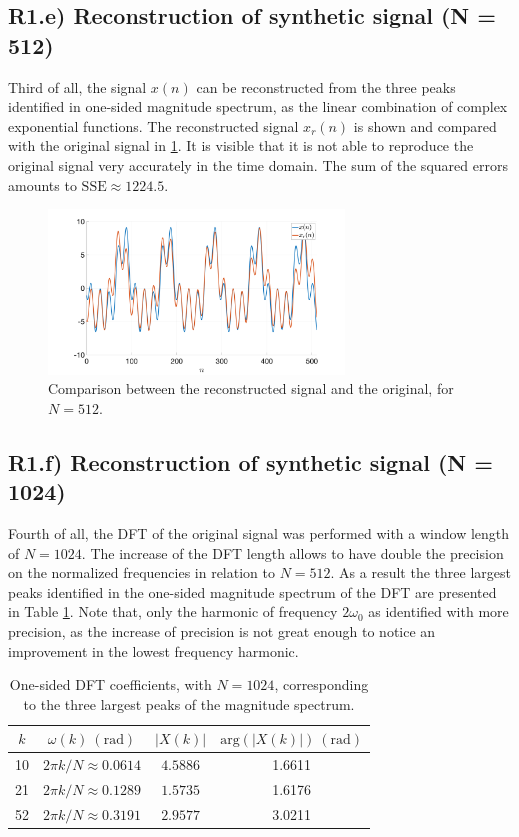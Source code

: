 \documentclass[a4paper, oneside, 11pt]{article}
\begin{document}
\subsection{R1.e) Reconstruction of synthetic signal (N = 512)}

Third of all, the signal $x(n)$ can be reconstructed from the three peaks identified in one-sided magnitude spectrum, as the linear combination of complex exponential functions. The reconstructed signal $x_r(n)$ is shown and compared with the original signal in \ref{fig:R1e}. It is visible that it is not able to reproduce the original signal very accurately in the time domain. The sum of the squared errors amounts to $\mathrm{SSE} \approx 1224.5$.

\begin{figure}[htbp]
	\centering
	\includegraphics[width= 0.7\textwidth]{figures/R1e.png}
	\caption{Comparison between the reconstructed signal and the original, for $N = 512$.}
	\label{fig:R1e}
\end{figure}

\subsection{R1.f) Reconstruction of synthetic signal (N = 1024)}

Fourth of all, the DFT of the original signal was performed with a window length of $N= 1024$. The increase of the DFT length allows to have double the precision on the normalized frequencies in relation to $N = 512$. As a result the three largest peaks identified in the one-sided magnitude spectrum of the DFT are presented in Table \ref{tb:peaks_N}. Note that, only the harmonic of frequency $2\omega_0$ as identified with more precision, as the increase of precision is not great enough to notice an improvement in the lowest frequency harmonic.

\begin{table}[htbp]
	\centering
	\caption{One-sided DFT coefficients, with $N = 1024$, corresponding to the three largest peaks of the magnitude spectrum.}
	\label{tb:peaks_N}
	\begin{tabular}{cccc}
		\hline
		$k$ & $\omega(k) \: (\mathrm{rad})$ & $|X(k)|$ & $\mathrm{arg}(|X(k)|)\: (\mathrm{rad})$\\
		\hline
		10 & $2\pi k/N \approx 0.0614$ & $ 4.5886$ & 1.6611\\
		21 & $2\pi k/N \approx 0.1289$ & $ 1.5735$ & 1.6176 \\
		52  & $2\pi k/N \approx 0.3191$ & $ 2.9577$ & 3.0211 \\
		\hline
	\end{tabular}
\end{table}
\end{document}

